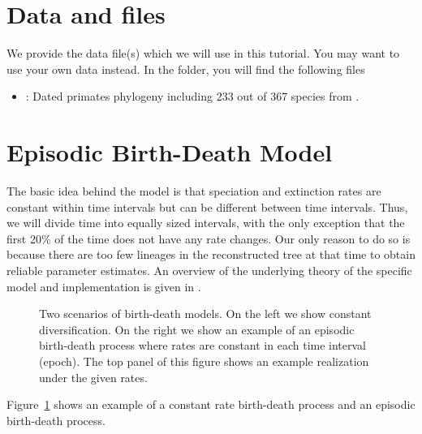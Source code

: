 \section{Data and files}

We provide the data file(s) which we will use in this tutorial.
You may want to use your own data instead.
In the  folder, you will find the following files
\begin{itemize}
\item {}: Dated primates phylogeny including 233 out of 367 species from \cite{MagnusonFord2012}.
\end{itemize}




\bigskip
\section{Episodic Birth-Death Model}

The basic idea behind the model is that speciation and extinction rates are constant within time intervals but can be different between time intervals.
Thus, we will divide time into equally sized intervals, with the only exception that the first 20\% of the time does not have any rate changes.
Our only reason to do so is because there are too few lineages in the reconstructed tree at that time to obtain reliable parameter estimates.
An overview of the underlying theory of the specific model and implementation is given in \cite{Hoehna2015a}.
\begin{figure}[h!]
\centering
{}
\caption{\small Two scenarios of birth-death models. On the left we show constant diversification. On the right we show an example of an episodic birth-death process where rates are constant in each time interval (epoch). The top panel of this figure shows an example realization under the given rates.}
\label{fig:EBD}
\end{figure}
Figure~\ref{fig:EBD} shows an example of a constant rate birth-death process and an episodic birth-death process.

